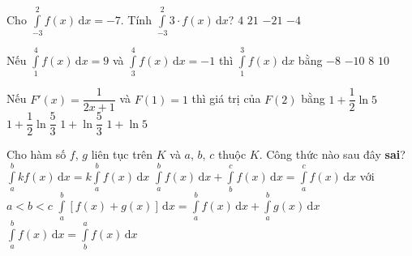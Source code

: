 \begin{ex}%
	Cho $\displaystyle\int\limits_{-3}^2 f(x)\mathrm{\,d}x = -7$. Tính $\displaystyle\int\limits_{-3}^2 3\cdot f(x)\mathrm{\,d}x$?
	\choice
	{$4$}
	{$21$}
	{\True $-21$}
	{$-4$}
\end{ex}
\begin{ex}%
	Nếu $\displaystyle\int\limits_1^4 f(x)\mathrm{\,d}x = 9$ và $\displaystyle\int\limits_3^4 f(x)\mathrm{\,d}x = -1$ thì $\displaystyle\int\limits_1^3 f(x)\mathrm{\,d}x$ bằng
	\choice
	{$-8$}
	{$-10$}
	{$8$}
	{\True $10$}
\end{ex}
\begin{ex}%
	Nếu $F'(x) = \dfrac{1}{2x+1}$ và $F(1) = 1$ thì giá trị của $F(2)$ bằng
	\choice
	{$1 + \dfrac{1}{2} \ln 5$}
	{\True $1 + \dfrac{1}{2} \ln \dfrac{5}{3}$}
	{$1 + \ln \dfrac{5}{3}$}
	{$1 + \ln 5$}
\end{ex}
\begin{ex}%
	Cho hàm số $f$, $g$ liên tục trên $K$ và $a$, $b$, $c$ thuộc $K$. Công thức nào sau đây \textbf{sai}?
	\choice
	{$\displaystyle\int\limits_a^b{kf(x)\mathrm{\,d}x=}k\int\limits_a^b{f(x)\mathrm{\,d}x}$}
	{$\displaystyle\int\limits_a^b{f(x)\mathrm{\,d}x+\int\limits_b^c{f(x)\mathrm{\,d}x}=}\int\limits_a^c{f(x)\mathrm{\,d}x}$ với $a < b < c$}
	{$\displaystyle\int\limits_a^b [f(x) + g(x)]\mathrm{\,d}x = \displaystyle\int\limits_a^b f(x)\mathrm{\,d}x + \displaystyle\int\limits_a^b g(x)\mathrm{\,d}x$}
	{\True $\displaystyle\int\limits_a^b f(x)\mathrm{\,d}x = \displaystyle\int\limits_b^a f(x)\mathrm{\,d}x$}
\end{ex}
